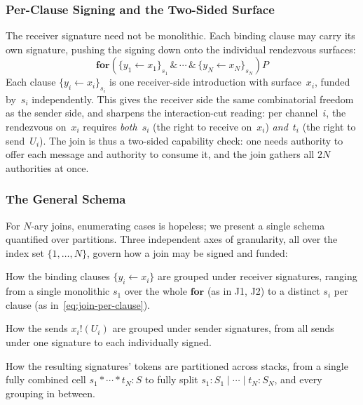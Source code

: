 \documentclass[11pt,a4paper]{article}
\newcommand{\Par}{\mathbin{|}}
\newcommand{\forc}{\mathbf{for}}
\newcommand{\send}[2]{#1 !\!\left( #2 \right)}
\newcommand{\signed}[2]{\{#1\}_{#2}}
\newcommand{\comp}{\mathbin{*}}
\begin{document}
\subsubsection{Per-Clause Signing and the Two-Sided Surface}

The receiver signature need not be monolithic.  Each binding
clause may carry its own signature, pushing the signing down
onto the individual rendezvous surfaces:
\begin{equation}
  \forc\!\left(
    \signed{y_1 \leftarrow x_1}{s_1} \,\&\, \cdots \,\&\,
    \signed{y_N \leftarrow x_N}{s_N}
  \right) P
  \label{eq:join-per-clause}
\end{equation}
Each clause $\signed{y_i \leftarrow x_i}{s_i}$ is one
receiver-side introduction with surface~$x_i$, funded by~$s_i$
independently.  This gives the receiver side the same
combinatorial freedom as the sender side, and sharpens the
interaction-cut reading: per channel~$i$, the rendezvous
on~$x_i$ requires \emph{both}~$s_i$ (the right to receive
on~$x_i$) \emph{and}~$t_i$ (the right to send~$U_i$).  The
join is thus a two-sided capability check: one needs authority
to offer each message and authority to consume it, and the
join gathers all $2N$ authorities at once.

\subsubsection{The General Schema}

For $N$-ary joins, enumerating cases is hopeless; we present a
single schema quantified over partitions.  Three independent
axes of granularity, all over the index set
$\{1, \ldots, N\}$, govern how a join may be signed and funded:

\begin{description}[style=nextline, leftmargin=2em, nosep]
  \item[Axis C (receiver clauses).]
    How the binding clauses $\{y_i \leftarrow x_i\}$ are
    grouped under receiver signatures, ranging from a single
    monolithic $s_1$ over the whole $\forc$ (as in J1, J2) to
    a distinct $s_i$ per clause (as
    in~\eqref{eq:join-per-clause}).
  \item[Axis B (sends).]
    How the sends $\send{x_i}{U_i}$ are grouped under sender
    signatures, from all sends under one signature to each
    individually signed.
  \item[Axis A (token presentation).]
    How the resulting signatures' tokens are partitioned across
    stacks, from a single fully combined cell
    $s_1 \comp \cdots \comp t_N : S$ to fully split
    $s_1 : S_1 \Par \cdots \Par t_N : S_N$, and every
    grouping in between.
\end{description}
\end{document}
